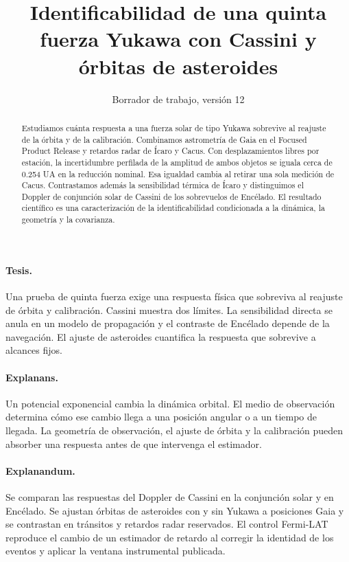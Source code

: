 \documentclass[11pt,a4paper]{article}
\title{Identificabilidad de una quinta fuerza Yukawa con Cassini y órbitas de asteroides}
\date{Borrador de trabajo, versión 12}
\begin{document}
\maketitle

\begin{abstract}
Estudiamos cuánta respuesta a una fuerza solar de tipo Yukawa sobrevive al reajuste de la órbita y de la calibración. Combinamos astrometría de Gaia en el Focused Product Release y retardos radar de Ícaro y Cacus. Con desplazamientos libres por estación, la incertidumbre perfilada de la amplitud de ambos objetos se iguala cerca de 0.254 UA en la reducción nominal. Esa igualdad cambia al retirar una sola medición de Cacus. Contrastamos además la sensibilidad térmica de Ícaro y distinguimos el Doppler de conjunción solar de Cassini de los sobrevuelos de Encélado. El resultado científico es una caracterización de la identificabilidad condicionada a la dinámica, la geometría y la covarianza.
\end{abstract}

\paragraph{Tesis.} Una prueba de quinta fuerza exige una respuesta física que sobreviva al reajuste de órbita y calibración. Cassini muestra dos límites. La sensibilidad directa se anula en un modelo de propagación y el contraste de Encélado depende de la navegación. El ajuste de asteroides cuantifica la respuesta que sobrevive a alcances fijos.

\paragraph{Explanans.} Un potencial exponencial cambia la dinámica orbital. El medio de observación determina cómo ese cambio llega a una posición angular o a un tiempo de llegada. La geometría de observación, el ajuste de órbita y la calibración pueden absorber una respuesta antes de que intervenga el estimador.

\paragraph{Explanandum.} Se comparan las respuestas del Doppler de Cassini en la conjunción solar y en Encélado. Se ajustan órbitas de asteroides con y sin Yukawa a posiciones Gaia y se contrastan en tránsitos y retardos radar reservados. El control Fermi-LAT reproduce el cambio de un estimador de retardo al corregir la identidad de los eventos y aplicar la ventana instrumental publicada.
\end{document}
